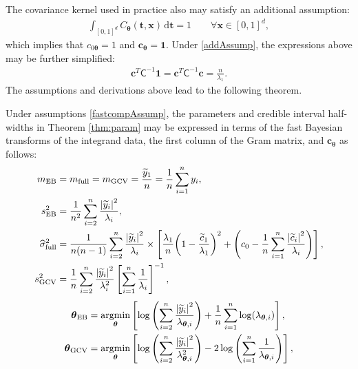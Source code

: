 \documentclass{svjour3}                     %
\newcommand{\bm}[1]{\boldsymbol{#1}}
\newcommand{\D}[1]{\text{d}{#1}}
\newcommand{\vtheta}{{\bm{\theta}}}
\newcommand{\vc}{\bm{c}}
\newcommand{\vt}{\bm{t}}
\newcommand{\vx}{\bm{x}}
\newcommand{\vone}{\bm{1}}
\newcommand{\mCInv}{\mathsf{C}^{-1}}
\newcommand{\MLE}{\textup{EB}}
\newcommand{\full}{\textup{full}}
\newcommand{\GCV}{\textup{GCV}}
\def\abs#1{\ensuremath{\left \lvert #1 \right \rvert}}
\providecommand{\argmin}{\operatorname*{argmin}}
\begin{document}
The covariance kernel used in practice also may satisfy an additional assumption:
\begin{align} \label{addAssump}
\int_{[0,1]^d} C_{\vtheta}(\vt,\vx) \, \D \vt = 1 \qquad \forall \vx \in [0,1]^d,
\end{align}
which implies that $c_{0\vtheta} = 1$ and $\vc_\vtheta = \vone$.  Under \eqref{addAssump}, the expressions above may be further simplified:
\begin{align*}
\vc^T\mCInv \vone =
\vc^T\mCInv \vc = \frac{n}{\lambda_1}.
\end{align*}
The assumptions and derivations above lead to the following theorem.

\begin{theorem} \label{thm:fastparam}
Under assumptions \eqref{fastcompAssump}, the parameters and credible interval half-widths in Theorem \ref{thm:param} may be expressed in terms of the fast Bayesian transforms of the integrand data, the first column of the Gram matrix, and $\vc_\vtheta$ as follows:
\begin{align}
\nonumber
m_\MLE &=  m_{\full} = m_{\GCV} =  \frac{\widetilde{y}_1}{n} = \frac 1n \sum_{i=1}^n y_i,
\\
\nonumber
s^2_\MLE 
& =
\frac{1}{n^2} 
\sum_{i=2}^n \frac{\abs{\widetilde{y}_i}^2}{\lambda_i}, \\
\nonumber
\widehat{\sigma}^2_{\textup{full}}
& =
\frac{1}{n(n-1)} \sum_{i=2}^n \frac{\abs{\widetilde{y}_i}^2}{\lambda_i}
\times
\left[\frac{\lambda_1}{n}{\left(1 - \frac{\widetilde{c}_1}{\lambda_1}\right)^2} + \left(c_0  - \frac 1n \sum_{i=1}^n \frac{\abs{\widetilde{c}_i}^2}{\lambda_i}\right) \right], \\
\nonumber 
s^2_{\textup{GCV}} & =  \frac 1{n} \sum_{i=2}^n \frac{\abs{\widetilde{y}_i}^2}{\lambda_i^2}  \left [ \sum_{i=1}^n \frac{1}{\lambda_i} \right]^{-1},
\end{align}
\begin{subequations}
\label{fastTheta}
\begin{align}
\label{eqn_MLE_loss_func_optimized_2}
\vtheta_\MLE
&= 
\argmin_{\vtheta}
\left[
\log\left(
\sum_{i=2}^n \frac{\abs{\widetilde{y}_i}^2}{\lambda_{\vtheta, i}}
\right) 
 + \frac{1}{n}\sum_{i=1}^n \log(\lambda_{\vtheta,i})
\right],\\
\label{thetaGCV} 
\vtheta_{\GCV} 
&= \argmin_\vtheta \left[ \log \left ( \sum_{i=2}^n \frac{\abs{\widetilde{y}_i}^2}{\lambda_{\vtheta, i}^2} 
\right)  
-2\log\left( \sum_{i=1}^n \frac{1}{\lambda_{\vtheta, i}} \right)
\right], 
\end{align}

\end{subequations}
\end{theorem}
\end{document}
